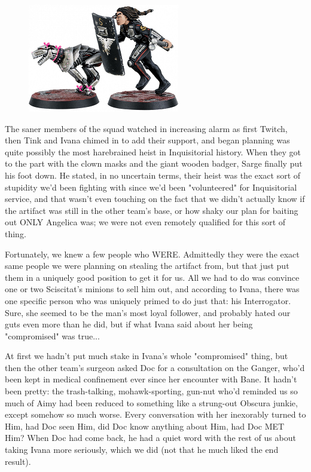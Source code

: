 \begin{figure}
	\begin{center}
		\includegraphics[width=\figwidth]{pics/19/32.png}
	\end{center}
\end{figure}
The saner members of the squad watched in increasing alarm as first Twitch, then Tink and Ivana chimed in to add their support, and began planning was quite possibly the most harebrained heist in Inquisitorial history. 
When they got to the part with the clown masks and the giant wooden badger, Sarge finally put his foot down. 
He stated, in no uncertain terms, their heist was the exact sort of stupidity we'd been fighting with since we'd been "volunteered" for Inquisitorial service, and that wasn't even touching on the fact that we didn't actually know if the artifact was still in the other team's base, or how shaky our plan for baiting out ONLY Angelica was; 
we were not even remotely qualified for this sort of thing. 


Fortunately, we knew a few people who WERE. 
Admittedly they were the exact same people we were planning on stealing the artifact from, but that just put them in a uniquely good position to get it for us. 
All we had to do was convince one or two Sciscitat's minions to sell him out, and according to Ivana, there was one specific person who was uniquely primed to do just that: 
his Interrogator. 
Sure, she seemed to be the man's most loyal follower, and probably hated our guts even more than he did, but if what Ivana said about her being "compromised" was true... 


At first we hadn't put much stake in Ivana's whole "compromised" thing, but then the other team's surgeon asked Doc for a consultation on the Ganger, who'd been kept in medical confinement ever since her encounter with Bane. 
It hadn't been pretty: 
the trash-talking, mohawk-sporting, gun-nut who'd reminded us so much of Aimy had been reduced to something like a strung-out Obscura junkie, except somehow so much worse. 
Every conversation with her inexorably turned to Him, had Doc seen Him, did Doc know anything about Him, had Doc MET Him? 
When Doc had come back, he had a quiet word with the rest of us about taking Ivana more seriously, which we did (not that he much liked the end result).

